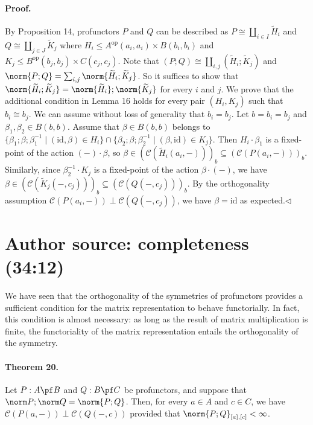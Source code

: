 \paragraph{Proof.} By Proposition 14, profunctors $P$ and $Q$ can be described as $P\cong\coprod_{i\in I}\widetilde H_i$ and $Q\cong\coprod_{j\in J}\widetilde K_j$ where $H_i\le A^{\mathrm{op}}(a_i,a_i)\times B(b_i,b_i)$ and $K_j\le B^{\mathrm{op}}(b_j,b_j)\times C(c_j,c_j)$. Note that $(P;Q)\cong\coprod_{i,j}(\widetilde H_i;\widetilde K_j)$ and $\norm{P;Q}=\sum_{i,j}\norm{\widetilde H_i;\widetilde K_j}$. So it suffices to show that $\norm{\widetilde H_i;\widetilde K_j}=\norm{\widetilde H_i};\norm{\widetilde K_j}$ for every $i$ and $j$.
We prove that the additional condition in Lemma 16 holds for every pair $(H_i,K_j)$ such that $b_i\cong b_j$. We can assume without loss of generality that $b_i=b_j$. Let $b=b_i=b_j$ and $\beta_1,\beta_2\in B(b,b)$. Assume that $\beta\in B(b,b)$ belongs to $\{\beta_1;\beta;\beta_1^{-1}\mid(\mathrm{id},\beta)\in H_i\}\cap\{\beta_2;\beta;\beta_2^{-1}\mid(\beta,\mathrm{id})\in K_j\}$. Then $H_i\cdot\beta_1$ is a fixed-point of the action $(-)\cdot\beta$, so $\beta\in(\mathcal C(\widetilde H_i(a_i,-)))_b\subseteq(\mathcal C(P(a_i,-)))_b$. Similarly, since $\beta_2^{-1}\cdot K_j$ is a fixed-point of the action $\beta\cdot(-)$, we have $\beta\in(\mathcal C(\widetilde K_j(-,c_j)))_b\subseteq(\mathcal C(Q(-,c_j)))_b$. By the orthogonality assumption $\mathcal C(P(a_i,-))\perp\mathcal C(Q(-,c_j))$, we have $\beta=\mathrm{id}$ as expected.\hfill$\triangleleft$
\section*{Author source: completeness (34:12)}
We have seen that the orthogonality of the symmetries of profunctors provides a sufficient condition for the matrix representation to behave functorially. In fact, this condition is almost necessary: as long as the result of matrix multiplication is finite, the functoriality of the matrix representation entails the orthogonality of the symmetry.
\paragraph{Theorem 20.} Let $P:A\pf B$ and $Q:B\pf C$ be profunctors, and suppose that $\norm P;\norm Q=\norm{P;Q}$. Then, for every $a\in A$ and $c\in C$, we have $\mathcal C(P(a,-))\perp\mathcal C(Q(-,c))$ provided that $\norm{P;Q}_{[a],[c]}<\infty$.
